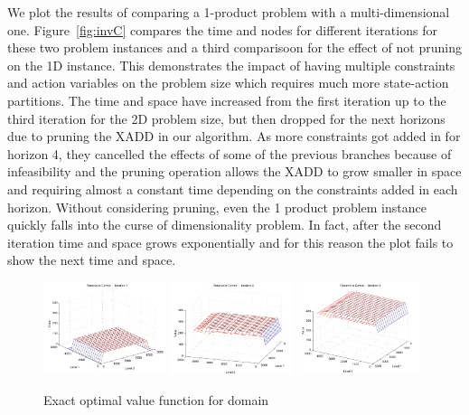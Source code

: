 We plot the results of comparing a 1-product \InventoryControl problem with
a multi-dimensional one. Figure~\ref{fig:invC} compares the time and nodes
for different iterations for these two problem instances and a third
comparisoon for the effect of not pruning on the 1D instance. This
demonstrates the impact of having multiple constraints and action variables
on the problem size which requires much more state-action partitions. The
time and space have increased from the first iteration up to the third
iteration for the 2D problem size, but then dropped for the next horizons
due to pruning the XADD in our algorithm. As more constraints got added in
for horizon 4, they cancelled the effects of some of the previous branches
because of infeasibility and the pruning operation allows the XADD to grow
smaller in space and requiring almost a constant time depending on the
constraints added in each horizon. Without considering pruning, even the 1
product problem instance quickly falls into the curse of dimensionality
problem. In fact, after the second iteration time and space grows
exponentially and for this reason the plot fails to show the next time and
space.
 
\begin{figure}[t!]
\centering
\includegraphics[width=0.32\textwidth]{Figures1/ref1.pdf}
\includegraphics[width=0.32\textwidth]{Figures1/ref3.pdf}
\includegraphics[width=0.32\textwidth]{Figures1/ref6.pdf}
\caption{\footnotesize
Exact optimal value function for \WaterReservoir domain
}
\label{fig:reservoir}
\end{figure}
 
